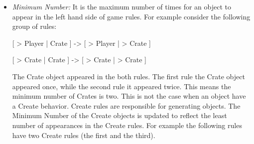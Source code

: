 \documentclass[letterpaper]{article}
\begin{document}
\begin{itemize}
		\begin{itemize}
			\item \emph{Move:} If an object on the left hand side have different movement than the right hand side, this object has a Move behavior. For example, In the following rule Crate moves when Player approaches it.
			\begin{center}
				[ > Player | Crate ] -> [ > Player | > Crate ]
			\end{center}
			\item \emph{Teleport:} An object is considered to have a Teleport behavior if its location in the rule changes from the left hand side to the right hand side. For example, In the following rule Crate changes position with Player on collision.
			\begin{center}
				[ > Player | Crate ] -> [ Crate | Player ]
			\end{center}
			\item \emph{Create:} If the number of a certain object on the left hand side is less than its number on the right hand side, then this object has a Create behavior. For example, In the following rule, Crate is created when Player moves to an empty place.
			\begin{center}
				[ > Player | \ \ \ \ ] -> [ Crate | Player ]
			\end{center}
			\item \emph{Destroy:} If the number of a certain object on the left hand side is greater than its number on the left hand side, then this object has a Destroy behavior. For example, In the following rule, the three Crates are destroyed when they are aligned beside each other.
			\begin{center}
				[ Crate | Crate | Crate ] -> [ \ \ \ \ | \ \ \ \ | \ \ \ \ ]
			\end{center}
		\end{itemize}
	\item \emph{Minimum Number:} It is the maximum number of times for an object to appear in the left hand side of game rules. For example consider the following group of rules:
	\begin{center}
		[ > Player | Crate ] -> [ > Player | > Crate ]
	\end{center}
	\begin{center}
		[ > Crate | Crate ] -> [ > Crate | > Crate ]
	\end{center}
	The Crate object appeared in the both rules. The first rule the Crate object appeared once, while the second rule it appeared twice. This means the minimum number of Crates is two. This is not the case when an object have a Create behavior. Create rules are responsible for generating objects. The Minimum Number of the Create objects is updated to reflect the least number of appearances in the Create rules. For example the following rules have two Create rules (the first and the third).

\end{itemize}
\end{document}
